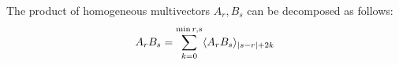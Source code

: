 \begin{theorem}\label{t:homog-product}
	The product of homogeneous multivectors $A_r, B_s$ can be decomposed as follows:
	\[A_rB_s = \sum_{k=0}^{\min{r,s}} \langle A_rB_s \rangle_{\left|s-r\right|+2k}\]
\end{theorem}
